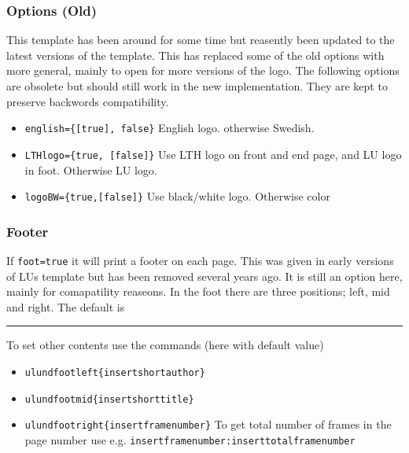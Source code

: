 \documentclass[aspectratio=1610]{beamer}
\def\txtbs{\symbol{92}}
\begin{document}
\begin{frame}%
  \frametitle{Options (Old)}
  This template has been around for some time but reasently been updated to the latest versions of the template. This has replaced some of the old options with more general, mainly to open for more versions of the logo. The following options are obsolete but should still work in the new implementation. They are kept to preserve backwords compatibility. 
  \begin{itemize}
  \item \texttt{english=\{[true], false\}}\newline
    English logo. otherwise Swedish.
  \item \texttt{LTHlogo=\{true, [false]\}}\newline
    Use LTH logo on front and end page, and LU logo in foot. Otherwise LU logo.
  \item \texttt{logoBW=\{true,[false]\}}\newpage
    Use black/white logo. Otherwise color
  \end{itemize}
\end{frame}

\begin{frame}%
  \frametitle{Footer}
  If \texttt{foot=true} it will print a footer on each page. This was given in early versions of LUs template but has been removed several years ago. It is still an option here, mainly for comapatility reaseons. In the foot there are three positions; left, mid and right. The default is
  \par\strut\par
  \rule{2em}{0pt}%
  \par\strut\par
  To set other contents use the commands (here with default value)
  \begin{itemize}
  \item \texttt{\txtbs ulundfootleft\{\txtbs insertshortauthor\}}
  \item \texttt{\txtbs ulundfootmid\{\txtbs insertshorttitle\}}
  \item \texttt{\txtbs ulundfootright\{\txtbs insertframenumber\}}\newline
  To get total number of frames in the page number use e.g. \texttt{\txtbs insertframenumber:\txtbs inserttotalframenumber}
  \end{itemize}
\end{frame}
\end{document}
